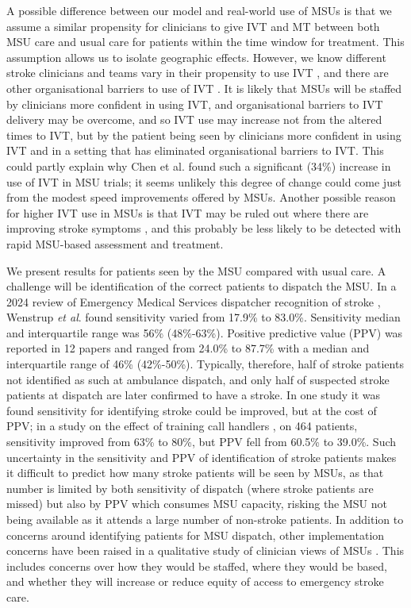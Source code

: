 A possible difference between our model and real-world use of MSUs is that we assume a similar propensity for clinicians to give IVT and MT between both MSU care and usual care for patients within the time window for treatment. This assumption allows us to isolate geographic effects. However, we know different stroke clinicians and teams vary in their propensity to use IVT \cite{de_brun_factors_2018, pearn_what_2023}, and there are other organisational barriers to use of IVT \cite{meurer_provider_2011}. It is likely that MSUs will be staffed by clinicians more confident in using IVT, and organisational barriers to IVT delivery may be overcome, and so IVT use may increase not from the altered times to IVT, but by the patient being seen by clinicians more confident in using IVT and in a setting that has eliminated organisational barriers to IVT. This could partly explain why Chen et al. \cite{chen_systematic_2022} found such a significant (34\%) increase in use of IVT in MSU trials; it seems unlikely this degree of change could come just from the modest speed improvements offered by MSUs. Another possible reason for higher IVT use in MSUs is that IVT may be ruled out where there are improving stroke symptoms \cite{balucani_mild_2011}, and this probably be less likely to be detected with rapid MSU-based assessment and treatment.

We present results for patients seen by the MSU compared with usual care. A challenge will be identification of the correct patients to dispatch the MSU. In a 2024 review of Emergency Medical Services dispatcher recognition of stroke \cite{wenstrup_emergency_2024}, Wenstrup \textit{et al}. found sensitivity varied from 17.9\% to 83.0\%. Sensitivity median and interquartile range was 56\% (48\%-63\%). Positive predictive value (PPV) was reported in 12 papers and ranged from 24.0\% to 87.7\% with a median and interquartile range of 46\% (42\%-50\%). Typically, therefore, half of stroke patients not identified as such at ambulance dispatch, and only half of suspected stroke patients at dispatch are later confirmed to have a stroke. In one study it was found sensitivity for identifying stroke could be improved, but at the cost of PPV; in a study on the effect of training call handlers \cite{watkins_training_2013}, on 464 patients, sensitivity improved from 63\% to 80\%, but PPV fell from 60.5\% to 39.0\%. Such uncertainty in the sensitivity and PPV of identification of stroke patients makes it difficult to predict how many stroke patients will be seen by MSUs, as that number is limited by both sensitivity of dispatch (where stroke patients are missed) but also by PPV which consumes MSU capacity, risking the MSU not being available as it attends a large number of non-stroke patients. In addition to concerns around identifying patients for MSU dispatch, other implementation concerns have been raised in a qualitative study of clinician views of MSUs \cite{moseley_practitioner_2024}. This includes concerns over how they would be staffed, where they would be based, and whether they will increase or reduce equity of access to emergency stroke care.

